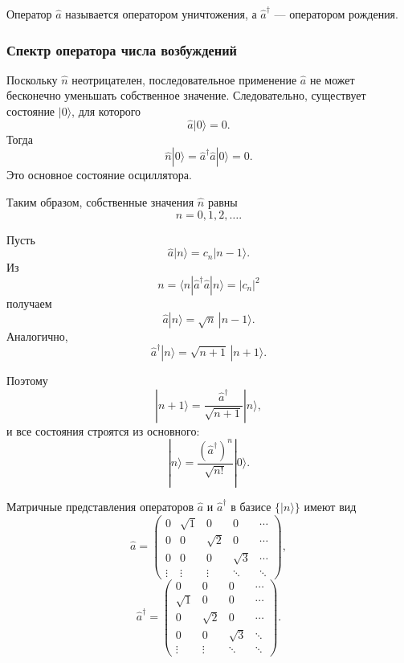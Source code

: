 \documentclass[12pt,a4paper]{article}
\begin{document}
Оператор $\hat a$ называется оператором уничтожения, а
$\hat a^\dagger$ --- оператором рождения.


\subsubsection{Спектр оператора числа возбуждений}

Поскольку $\hat n$ неотрицателен, последовательное применение
$\hat a$ не может бесконечно уменьшать собственное значение.
Следовательно, существует состояние $|0\rangle$, для которого
\[
    \boxed{
        \hat a|0\rangle=0
    }.
\]
Тогда
\[
    \hat n|0\rangle
    =
    \hat a^\dagger\hat a|0\rangle
    =
    0.
\]
Это основное состояние осциллятора.

Таким образом, собственные значения $\hat n$ равны
\[
    \boxed{
        n=0,1,2,\ldots
    }.
\]

Пусть
\[
    \hat a|n\rangle
    =
    c_n|n-1\rangle.
\]
Из
\[
    n
    =
    \langle n|
        \hat a^\dagger\hat a
    |n\rangle
    =
    |c_n|^2
\]
получаем
\[
    \boxed{
        \hat a|n\rangle
        =
        \sqrt n\,|n-1\rangle
    }.
\]
Аналогично,
\[
    \boxed{
        \hat a^\dagger|n\rangle
        =
        \sqrt{n+1}\,|n+1\rangle
    }.
\]

Поэтому
\[
    \boxed{
        |n+1\rangle
        =
        \frac{\hat a^\dagger}{\sqrt{n+1}}
        |n\rangle
    },
\]
и все состояния строятся из основного:
\[
    \boxed{
        |n\rangle
        =
        \frac{(\hat a^\dagger)^n}{\sqrt{n!}}
        |0\rangle
    }.
\]

Матричные представления операторов $\hat a$ и $\hat a^\dagger$ в
базисе $\{|n\rangle\}$ имеют вид
\[
    \hat a
    =
    \begin{pmatrix}
        0 & \sqrt1 & 0 & 0 & \cdots\\
        0 & 0 & \sqrt2 & 0 & \cdots\\
        0 & 0 & 0 & \sqrt3 & \cdots\\
        \vdots & \vdots & \vdots & \ddots & \ddots
    \end{pmatrix},
\]
\[
    \hat a^\dagger
    =
    \begin{pmatrix}
        0 & 0 & 0 & \cdots\\
        \sqrt1 & 0 & 0 & \cdots\\
        0 & \sqrt2 & 0 & \cdots\\
        0 & 0 & \sqrt3 & \ddots\\
        \vdots & \vdots & \ddots & \ddots
    \end{pmatrix}.
\]
\end{document}
